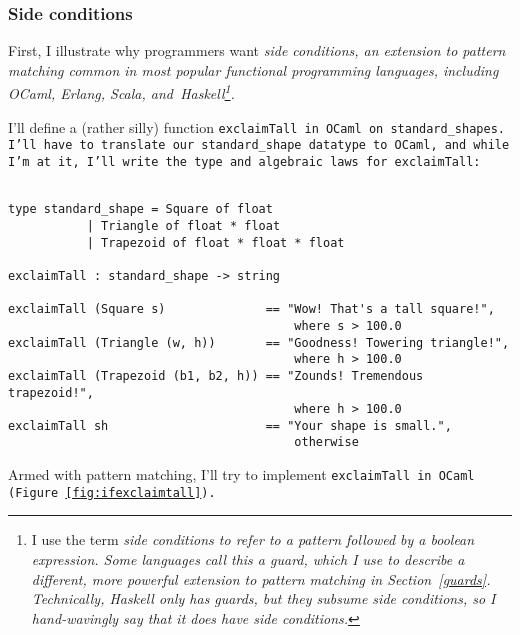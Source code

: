 \documentclass[manuscript,screen,review, 12pt, nonacm]{acmart}
\begin{document}
\subsubsection{Side conditions}

    First, I illustrate why programmers want \it{side conditions}, an extension
    to pattern matching common in most popular functional programming languages,
    including OCaml, Erlang, Scala, and~Haskell\footnote{I use the term \it{side
    conditions} to refer to a pattern followed by a boolean expression. Some
    languages call this a \it{guard}, which I use to describe a different, more
    powerful extension to pattern matching in Section~\ref{guards}.  
    Technically, Haskell \it{only} has guards, but they subsume side conditions,
    so I hand-wavingly say that it does have side conditions.}. 
    
    I'll define a (rather silly) function \tt{exclaimTall} in OCaml on
    \tt{standard\_shape}s. I'll have to translate our \tt{standard\_shape} datatype to OCaml, and
    while I'm at it, I'll write the type and algebraic laws for
    \tt{exclaimTall}:

    \begin{minipage}[t]{\textwidth}        
        \centering 
        \begin{verbatim}

type standard_shape = Square of float 
           | Triangle of float * float
           | Trapezoid of float * float * float

exclaimTall : standard_shape -> string 

exclaimTall (Square s)              == "Wow! That's a tall square!", 
                                        where s > 100.0
exclaimTall (Triangle (w, h))       == "Goodness! Towering triangle!",
                                        where h > 100.0
exclaimTall (Trapezoid (b1, b2, h)) == "Zounds! Tremendous trapezoid!", 
                                        where h > 100.0
exclaimTall sh                      == "Your shape is small.", 
                                        otherwise
    \end{verbatim}
    \end{minipage}

    Armed with pattern matching, I'll try to implement \tt{exclaimTall} in OCaml
    (Figure~\ref{fig:ifexclaimtall}).
\end{document}
